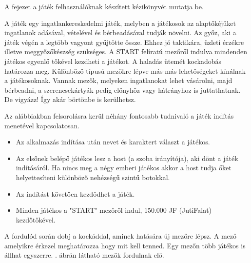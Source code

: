 
A fejezet a játék felhasználóknak készített kézikönyvét mutatja be.


A játék egy ingatlankereskedelmi játék, melyben a játékosok az alaptőkéjüket ingatlanok adásával, vételével és bérbeadásával tudják növelni. Az győz, aki a játék végén a legtöbb vagyont gyűjtötte össze. Ehhez jó taktikára, üzleti érzékre illetve meggyőzőkészség szükséges. A START felíratú mezőről indulva mindenden játékos egyenlő tőkével kezdheti a játékot. A haladás ütemét kockadobás határozza meg. Különböző típusú mezőkre lépve más-más lehetőségeket kínálnak a játékosoknak. Vannak mezők, melyeken ingatlanokat lehet vásárolni, majd bérbeadni, a szerencsekártyák pedig előnyhöz vagy hátrányhoz is juttathatnak. De vigyázz! Így akár börtönbe is kerülhetsz. 


Az alábbiakban felsorolásra kerül néhány fontosabb tudnivaló a játék indítás menetével kapcsolatosan.

\begin{itemize}
\item Az alkalmazás indítása után nevet és karaktert választ a játékos.
\item Az elsőnek belépő játékos lesz a host (a szoba irányítója), aki dönt a játék indításáról. Ha nincs meg a négy emberi játékos akkor a host tudja őket helyettesíteni különböző nehézségű szintű botokkal.
\item Az indítást követően kezdődhet a játék.
\item Minden játékos a "START" mezőről indul, 150.000 JF (JutiFalat) kezdőtőkével.
\end{itemize}


A fordulód során dobj a kockáddal, aminek hatására új mezőre lépsz. A mező amelyikre érkezel meghatározza hogy mit kell tenned. Egy mezőn több játékos is állhat egyszerre.
. ábrán látható mezők fordulnak elő.

